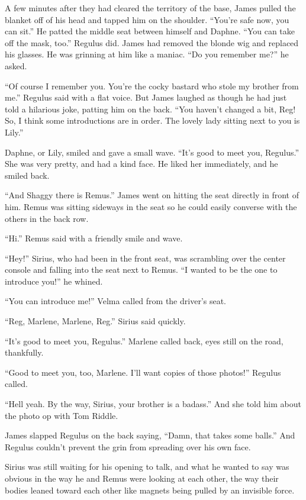 \documentclass[12pt,twoside,openright]{memoir}
\begin{document}
A few minutes after they had cleared the territory of the base, James pulled the blanket off of his head and tapped him on the shoulder. ``You're safe now, you can sit.'' He patted the middle seat between himself and Daphne. ``You can take off the mask, too.'' Regulus did. James had removed the blonde wig and replaced his glasses. He was grinning at him like a maniac. ``Do you remember me?'' he asked.

``Of course I remember you. You're the cocky bastard who stole my brother from me.'' Regulus said with a flat voice. But James laughed as though he had just told a hilarious joke, patting him on the back. ``You haven't changed a bit, Reg! So, I think some introductions are in order. The lovely lady sitting next to you is Lily.'' 

Daphne, or Lily, smiled and gave a small wave. ``It's good to meet you, Regulus.'' She was very pretty, and had a kind face. He liked her immediately, and he smiled back. 

``And Shaggy there is Remus.'' James went on hitting the seat directly in front of him. Remus was sitting sideways in the seat so he could easily converse with the others in the back row. 

``Hi.'' Remus said with a friendly smile and wave. 

``Hey!'' Sirius, who had been in the front seat, was scrambling over the center console and falling into the seat next to Remus. ``I wanted to be the one to introduce you!'' he whined.

``You can introduce me!'' Velma called from the driver's seat.

``Reg, Marlene, Marlene, Reg.'' Sirius said quickly. 

``It's good to meet you, Regulus.'' Marlene called back, eyes still on the road, thankfully. 

``Good to meet you, too, Marlene. I'll want copies of those photos!'' Regulus called. 

``Hell yeah. By the way, Sirius, your brother is a badass.'' And she told him about the photo op with Tom Riddle. 

James slapped Regulus on the back saying, ``Damn, that takes some balls.'' And Regulus couldn't prevent the grin from spreading over his own face. 

Sirius was still waiting for his opening to talk, and what he wanted to say was obvious in the way he and Remus were looking at each other, the way their bodies leaned toward each other like magnets being pulled by an invisible force. 
\end{document}
